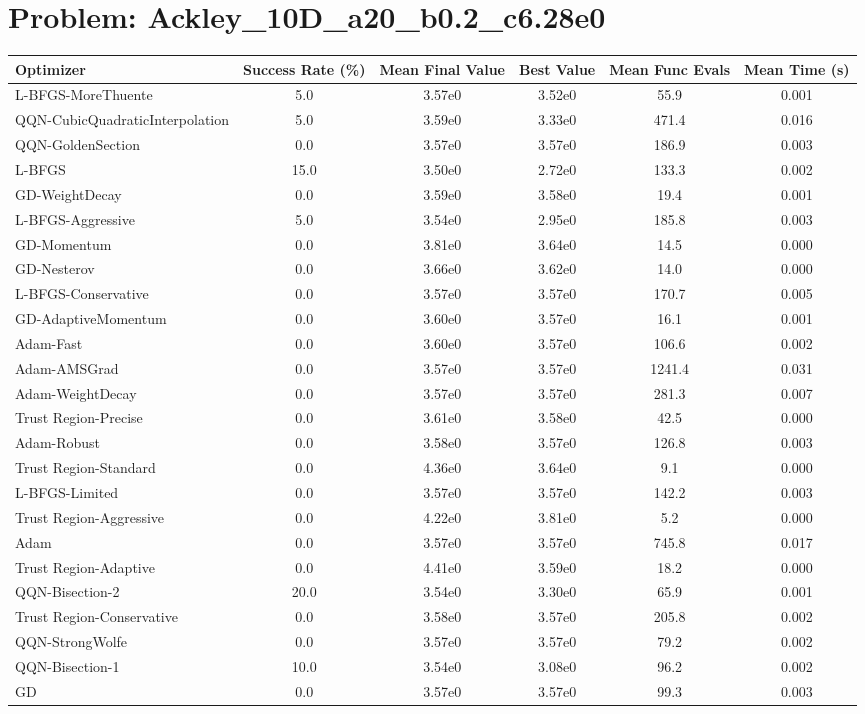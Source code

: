 \documentclass{article}
\begin{document}
\section{Problem: Ackley\_10D\_a20\_b0.2\_c6.28e0}
\begin{longtable}{p{3cm}*{5}{c}}
\toprule
\textbf{Optimizer} & \textbf{Success Rate (\%)} & \textbf{Mean Final Value} & \textbf{Best Value} & \textbf{Mean Func Evals} & \textbf{Mean Time (s)} \\
\midrule
L-BFGS-MoreThuente & 5.0 & 3.57e0 & 3.52e0 & 55.9 & 0.001 \\
QQN-CubicQuadraticInterpolation & 5.0 & 3.59e0 & 3.33e0 & 471.4 & 0.016 \\
QQN-GoldenSection & 0.0 & 3.57e0 & 3.57e0 & 186.9 & 0.003 \\
L-BFGS & 15.0 & 3.50e0 & 2.72e0 & 133.3 & 0.002 \\
GD-WeightDecay & 0.0 & 3.59e0 & 3.58e0 & 19.4 & 0.001 \\
L-BFGS-Aggressive & 5.0 & 3.54e0 & 2.95e0 & 185.8 & 0.003 \\
GD-Momentum & 0.0 & 3.81e0 & 3.64e0 & 14.5 & 0.000 \\
GD-Nesterov & 0.0 & 3.66e0 & 3.62e0 & 14.0 & 0.000 \\
L-BFGS-Conservative & 0.0 & 3.57e0 & 3.57e0 & 170.7 & 0.005 \\
GD-AdaptiveMomentum & 0.0 & 3.60e0 & 3.57e0 & 16.1 & 0.001 \\
Adam-Fast & 0.0 & 3.60e0 & 3.57e0 & 106.6 & 0.002 \\
Adam-AMSGrad & 0.0 & 3.57e0 & 3.57e0 & 1241.4 & 0.031 \\
Adam-WeightDecay & 0.0 & 3.57e0 & 3.57e0 & 281.3 & 0.007 \\
Trust Region-Precise & 0.0 & 3.61e0 & 3.58e0 & 42.5 & 0.000 \\
Adam-Robust & 0.0 & 3.58e0 & 3.57e0 & 126.8 & 0.003 \\
Trust Region-Standard & 0.0 & 4.36e0 & 3.64e0 & 9.1 & 0.000 \\
L-BFGS-Limited & 0.0 & 3.57e0 & 3.57e0 & 142.2 & 0.003 \\
Trust Region-Aggressive & 0.0 & 4.22e0 & 3.81e0 & 5.2 & 0.000 \\
Adam & 0.0 & 3.57e0 & 3.57e0 & 745.8 & 0.017 \\
Trust Region-Adaptive & 0.0 & 4.41e0 & 3.59e0 & 18.2 & 0.000 \\
QQN-Bisection-2 & 20.0 & 3.54e0 & 3.30e0 & 65.9 & 0.001 \\
Trust Region-Conservative & 0.0 & 3.58e0 & 3.57e0 & 205.8 & 0.002 \\
QQN-StrongWolfe & 0.0 & 3.57e0 & 3.57e0 & 79.2 & 0.002 \\
QQN-Bisection-1 & 10.0 & 3.54e0 & 3.08e0 & 96.2 & 0.002 \\
GD & 0.0 & 3.57e0 & 3.57e0 & 99.3 & 0.003 \\
\bottomrule
\end{longtable}
\end{document}

